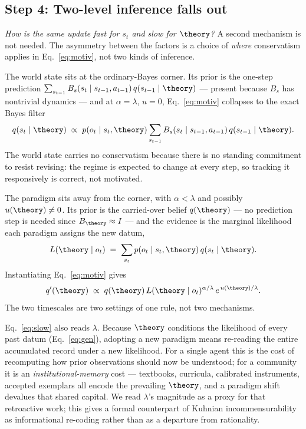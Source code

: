 \subsection{Step 4: Two-level inference falls out}
\label{ssec:twolevel}

\noindent\textit{How is the same update fast for $s_t$ and slow for
$\theory$?} A second mechanism is not needed. The asymmetry between
the factors is a choice of \emph{where} conservatism applies in
Eq.~\eqref{eq:motiv}, not two kinds of inference.

The world state sits at the ordinary-Bayes corner. Its prior is the
one-step prediction
$\sum_{s_{t-1}} B_s(s_t \mid s_{t-1}, a_{t-1})\, q(s_{t-1} \mid \theory)$
--- present because $B_s$ has nontrivial dynamics --- and at
$\alpha = \lambda$, $u = 0$, Eq.~\eqref{eq:motiv} collapses to the
exact Bayes filter
\begin{equation}
q(s_t \mid \theory) \;\propto\;
p(o_t \mid s_t, \theory)
\sum_{s_{t-1}} B_s(s_t \mid s_{t-1}, a_{t-1})\, q(s_{t-1} \mid \theory).
\label{eq:fast}
\end{equation}
The world state carries no conservatism because there is no standing
commitment to resist revising: the regime is expected to change at
every step, so tracking it responsively is correct, not motivated.

The paradigm sits away from the corner, with $\alpha < \lambda$ and
possibly $u(\theory) \neq 0$. Its prior is the carried-over belief
$q(\theory)$ --- no prediction step is needed since
$B_\theory \approx I$ --- and the evidence is the marginal likelihood
each paradigm assigns the new datum,
\begin{equation}
L(\theory \mid o_t)
\;=\;
\sum_{s_t} p(o_t \mid s_t, \theory)\, q(s_t \mid \theory).
\label{eq:marglik}
\end{equation}
Instantiating Eq.~\eqref{eq:motiv} gives
\begin{equation}
q'(\theory)
\;\propto\;
q(\theory)\, L(\theory \mid o_t)^{\alpha/\lambda}\,
e^{\, u(\theory)/\lambda}.
\label{eq:slow}
\end{equation}
The two timescales are two settings of one rule, not two mechanisms.

Eq.~\eqref{eq:slow} also reads $\lambda$. Because $\theory$ conditions
the likelihood of every past datum (Eq.~\ref{eq:gen}), adopting a new
paradigm means re-reading the entire accumulated record under a new
likelihood. For a single agent this is the cost of recomputing how
prior observations should now be understood; for a community it is
an \emph{institutional-memory} cost --- textbooks, curricula,
calibrated instruments, accepted exemplars
\citep{Heijdra1986_6,Wahyudi2026_2} all encode the prevailing
$\theory$, and a paradigm shift devalues that shared capital. We
read $\lambda$'s magnitude as a proxy for that retroactive work; this
gives a formal counterpart of Kuhnian incommensurability as
informational re-coding rather than as a departure from rationality.

